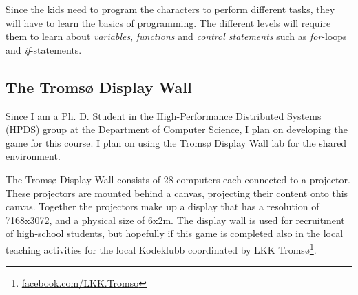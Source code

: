 \documentclass[11pt,journal,compsoc]{IEEEtran}
\begin{document}
Since the kids need to program the characters to perform different tasks, they
will have to learn the basics of programming. The different levels will require
them to learn about \emph{variables}, \emph{functions} and \emph{control
statements} such as \emph{for}-loops and \emph{if}-statements. 

\subsection{The Tromsø Display Wall}
Since I am a Ph. D. Student in the High-Performance Distributed Systems (HPDS)
group at the Department of Computer Science, I plan on developing the game for
this course. I plan on using the Tromsø Display Wall lab for the shared
environment. 

The Tromsø Display Wall consists of 28 computers each connected to a projector.
These projectors are mounted behind a canvas, projecting their content onto this
canvas. Together the projectors make up a display that has a resolution of 
7168x3072, and a physical size of 6x2m. The display wall is used for recruitment
of high-school students, but hopefully if this game is completed also in the
local teaching activities for the local Kodeklubb coordinated by LKK
Tromsø\footnote{\url{facebook.com/LKK.Tromso}}. 
\end{document}
